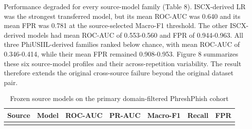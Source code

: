 \documentclass[
  10pt,
]{article}
\begin{document}
Performance degraded for every source-model family (Table 8).
ISCX-derived LR was the strongest transferred model, but its mean
ROC-AUC was 0.640 and its mean FPR was 0.781 at the source-selected
Macro-F1 threshold. The other ISCX-derived models had mean ROC-AUC of
0.553-0.560 and FPR of 0.944-0.963. All three PhiUSIIL-derived families
ranked below chance, with mean ROC-AUC of 0.346-0.414, while their mean
FPR remained 0.908-0.953. Figure 8 summarizes these six source-model
profiles and their across-repetition variability. The result therefore
extends the original cross-source failure beyond the original dataset
pair.

\begin{longtable}[]{@{}
  >{\raggedright\arraybackslash}p{}
  >{\raggedright\arraybackslash}p{}
  >{\raggedleft\arraybackslash}p{}
  >{\raggedleft\arraybackslash}p{}
  >{\raggedleft\arraybackslash}p{}
  >{\raggedleft\arraybackslash}p{}
  >{\raggedleft\arraybackslash}p{}@{}}
\caption{Frozen source models on the primary domain-filtered PhreshPhish
cohort}\tabularnewline
\toprule\noalign{}
\begin{minipage}[b]{\linewidth}\raggedright
Source
\end{minipage} & \begin{minipage}[b]{\linewidth}\raggedright
Model
\end{minipage} & \begin{minipage}[b]{\linewidth}\raggedleft
ROC-AUC
\end{minipage} & \begin{minipage}[b]{\linewidth}\raggedleft
PR-AUC
\end{minipage} & \begin{minipage}[b]{\linewidth}\raggedleft
Macro-F1
\end{minipage} & \begin{minipage}[b]{\linewidth}\raggedleft
Recall
\end{minipage} & \begin{minipage}[b]{\linewidth}\raggedleft
FPR
\end{minipage} \\
\midrule\noalign{}
\endfirsthead
\toprule\noalign{}
\begin{minipage}[b]{\linewidth}\raggedright

\end{minipage}
\end{longtable}
\end{document}
